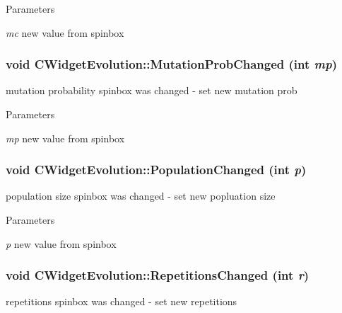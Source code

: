 \begin{DoxyParams}{Parameters}
\item[{\em mc}]new value from spinbox \end{DoxyParams}
\hypertarget{classCWidgetEvolution_aaf76f3b21dc7558b9d488e747409b66a}{
\subsubsection[{MutationProbChanged}]{\setlength{\rightskip}{0pt plus 5cm}void CWidgetEvolution::MutationProbChanged (int {\em mp})}}
\label{classCWidgetEvolution_aaf76f3b21dc7558b9d488e747409b66a}
mutation probability spinbox was changed -\/ set new mutation prob


\begin{DoxyParams}{Parameters}
\item[{\em mp}]new value from spinbox \end{DoxyParams}
\hypertarget{classCWidgetEvolution_a1931e0c63052127070ecd8ad86f87530}{
\subsubsection[{PopulationChanged}]{\setlength{\rightskip}{0pt plus 5cm}void CWidgetEvolution::PopulationChanged (int {\em p})}}
\label{classCWidgetEvolution_a1931e0c63052127070ecd8ad86f87530}
population size spinbox was changed -\/ set new popluation size


\begin{DoxyParams}{Parameters}
\item[{\em p}]new value from spinbox \end{DoxyParams}
\hypertarget{classCWidgetEvolution_a4a2344ac3739e3c9360dd3b1ede65dda}{
\subsubsection[{RepetitionsChanged}]{\setlength{\rightskip}{0pt plus 5cm}void CWidgetEvolution::RepetitionsChanged (int {\em r})}}
\label{classCWidgetEvolution_a4a2344ac3739e3c9360dd3b1ede65dda}
repetitions spinbox was changed -\/ set new repetitions


